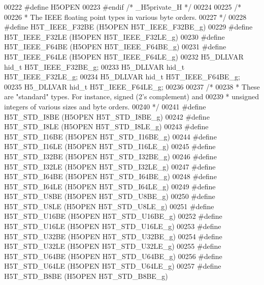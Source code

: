 \begin{DoxyCode}
00222 \textcolor{preprocessor}{#define H5OPEN}
00223 \textcolor{preprocessor}{#endif  }\textcolor{comment}{/* \_H5private\_H */}\textcolor{preprocessor}{}
00224 
00225 \textcolor{comment}{/*}
00226 \textcolor{comment}{ * The IEEE floating point types in various byte orders.}
00227 \textcolor{comment}{ */}
00228 \textcolor{preprocessor}{#define H5T\_IEEE\_F32BE      (H5OPEN H5T\_IEEE\_F32BE\_g)}
00229 \textcolor{preprocessor}{#define H5T\_IEEE\_F32LE      (H5OPEN H5T\_IEEE\_F32LE\_g)}
00230 \textcolor{preprocessor}{#define H5T\_IEEE\_F64BE      (H5OPEN H5T\_IEEE\_F64BE\_g)}
00231 \textcolor{preprocessor}{#define H5T\_IEEE\_F64LE      (H5OPEN H5T\_IEEE\_F64LE\_g)}
00232 H5\_DLLVAR hid\_t H5T\_IEEE\_F32BE\_g;
00233 H5\_DLLVAR hid\_t H5T\_IEEE\_F32LE\_g;
00234 H5\_DLLVAR hid\_t H5T\_IEEE\_F64BE\_g;
00235 H5\_DLLVAR hid\_t H5T\_IEEE\_F64LE\_g;
00236 
00237 \textcolor{comment}{/*}
00238 \textcolor{comment}{ * These are "standard" types.  For instance, signed (2's complement) and}
00239 \textcolor{comment}{ * unsigned integers of various sizes and byte orders.}
00240 \textcolor{comment}{ */}
00241 \textcolor{preprocessor}{#define H5T\_STD\_I8BE        (H5OPEN H5T\_STD\_I8BE\_g)}
00242 \textcolor{preprocessor}{#define H5T\_STD\_I8LE        (H5OPEN H5T\_STD\_I8LE\_g)}
00243 \textcolor{preprocessor}{#define H5T\_STD\_I16BE       (H5OPEN H5T\_STD\_I16BE\_g)}
00244 \textcolor{preprocessor}{#define H5T\_STD\_I16LE       (H5OPEN H5T\_STD\_I16LE\_g)}
00245 \textcolor{preprocessor}{#define H5T\_STD\_I32BE       (H5OPEN H5T\_STD\_I32BE\_g)}
00246 \textcolor{preprocessor}{#define H5T\_STD\_I32LE       (H5OPEN H5T\_STD\_I32LE\_g)}
00247 \textcolor{preprocessor}{#define H5T\_STD\_I64BE       (H5OPEN H5T\_STD\_I64BE\_g)}
00248 \textcolor{preprocessor}{#define H5T\_STD\_I64LE       (H5OPEN H5T\_STD\_I64LE\_g)}
00249 \textcolor{preprocessor}{#define H5T\_STD\_U8BE        (H5OPEN H5T\_STD\_U8BE\_g)}
00250 \textcolor{preprocessor}{#define H5T\_STD\_U8LE        (H5OPEN H5T\_STD\_U8LE\_g)}
00251 \textcolor{preprocessor}{#define H5T\_STD\_U16BE       (H5OPEN H5T\_STD\_U16BE\_g)}
00252 \textcolor{preprocessor}{#define H5T\_STD\_U16LE       (H5OPEN H5T\_STD\_U16LE\_g)}
00253 \textcolor{preprocessor}{#define H5T\_STD\_U32BE       (H5OPEN H5T\_STD\_U32BE\_g)}
00254 \textcolor{preprocessor}{#define H5T\_STD\_U32LE       (H5OPEN H5T\_STD\_U32LE\_g)}
00255 \textcolor{preprocessor}{#define H5T\_STD\_U64BE       (H5OPEN H5T\_STD\_U64BE\_g)}
00256 \textcolor{preprocessor}{#define H5T\_STD\_U64LE       (H5OPEN H5T\_STD\_U64LE\_g)}
00257 \textcolor{preprocessor}{#define H5T\_STD\_B8BE        (H5OPEN H5T\_STD\_B8BE\_g)}

\end{DoxyCode}
